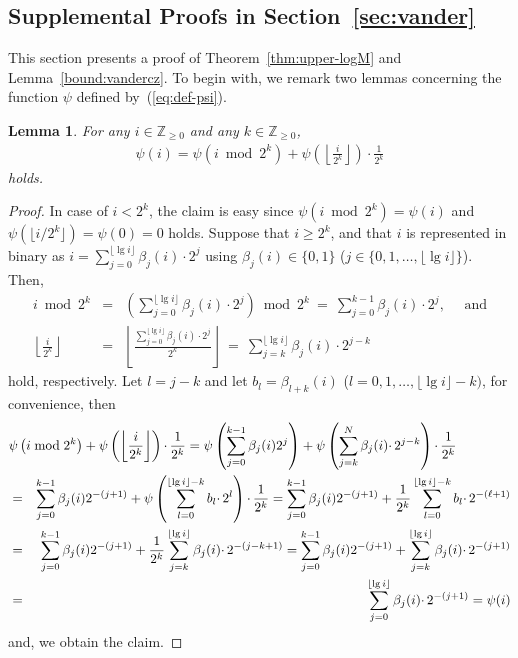 \documentclass[letter, 11pt]{article}
\newcommand{\1}{\mbox{1}\hspace{-0.25em}\mbox{l}}
\newtheorem{lemma}[theorem]{Lemma}
\begin{document}
\subsection{Supplemental Proofs in Section~\ref{sec:vander}}\label{appendix:vander}
This section presents a proof of Theorem~\ref{thm:upper-logM} and Lemma~\ref{bound:vandercz}. 
To begin with, we remark two lemmas concerning the function $\psi$ defined by~(\ref{eq:def-psi}). 
\begin{lemma}\label{lemmf2}
 For any $i\in \mathbb{Z}_{\geq 0}$ and any $k \in \mathbb{Z}_{\geq 0}$, 
\begin{eqnarray*}
\psi(i)=\psi\left( i \bmod{2^k} \right) +\psi\left( \left \lfloor \frac{i}{2^k}\right \rfloor \right)\cdotp \frac{1}{2^k}
\end{eqnarray*}
 holds. 
\end{lemma}
\begin{proof}
 In case of $i<2^k$, 
   the claim is easy 
  since
   $\psi(i \bmod{2^k}) = \psi(i)$ and 
   $\psi(\lfloor i/2^k \rfloor )=\psi(0)=0$ holds. 
Suppose that $i\geq 2^k$, and that 
  $i$ 
   is represented in binary as $i=\sum^{\lfloor \lg i \rfloor}_{j=0} \beta_j(i) \cdotp 2^j$ 
   using $\beta_j(i) \in \{0,1\}$ ($j \in \{0,1,\ldots, \lfloor \lg i \rfloor\}$). 
 Then, 
\begin{eqnarray*}
i \bmod 2^k
 &=& \left(\sum^{\lfloor \lg i \rfloor}_{j=0}\beta_j (i)  \cdotp 2^j \right) \bmod{2^k}
\ =\  \sum_{j=0}^{k-1}\beta_j (i) \cdotp 2^j, \hspace{1em} \mbox{ and}\\
\left \lfloor \frac{i}{2^k}\right \rfloor
 &=& \left \lfloor \frac{\sum^{\lfloor \lg i \rfloor}_{j=0} \beta_j (i)  \cdotp 2^j}{2^k}\right \rfloor
\ =\ \sum_{j=k}^{\lfloor \lg i \rfloor}\beta_j (i) \cdotp 2^{j-k}
\end{eqnarray*} 
  hold, respectively. 
 Let $l =j-k$ and 
 let $b_l = \beta_{l+k} (i)$ ($l = 0, 1, \ldots, \lfloor \lg i \rfloor-k)$, for convenience, 
  then 
\begin{eqnarray*}
\lefteqn{ \psi\left( i\bmod 2^k\right) +\psi\left( \left \lfloor \frac{i}{2^k}\right \rfloor \right)\cdotp\frac{1}{2^k}
 = \psi\left( \sum_{j=0}^{k-1}\beta_j (i)2^j\right) +\psi\left( \sum_{j=k}^{N}\beta_j (i) \cdotp 2^{j-k}\right) \cdotp\frac{1}{2^k} } \\ 
 &=& \sum_{j=0}^{k-1}\beta_j (i)2^{-(j+1)}+\psi\left( \sum_{l=0}^{\lfloor \lg i \rfloor-k}b_l \cdotp 2^{l}\right) \cdotp\frac{1}{2^k} 
 = \sum_{j=0}^{k-1}\beta_j (i)2^{-(j+1)}+\frac{1}{2^k} \sum_{l=0}^{\lfloor \lg i \rfloor-k}b_l \cdotp 2^{-(\ell +1)} \\
 &=& \sum_{j=0}^{k-1}\beta_j (i)2^{-(j+1)}+\frac{1}{2^k} \sum_{j=k}^{\lfloor \lg i \rfloor}\beta_j (i) \cdotp 2^{-(j-k+1)}
 = \sum_{j=0}^{k-1}\beta_j (i)2^{-(j+1)}+\sum_{j=k}^{\lfloor \lg i \rfloor}\beta_j (i) \cdotp 2^{-(j+1)}\\
 &=& \sum_{j=0}^{\lfloor \lg i \rfloor}\beta_j (i) \cdotp 2^{-(j+1)} 
 = \psi(i)
\end{eqnarray*}
 and, we obtain the claim.
\end{proof}
\end{document}

